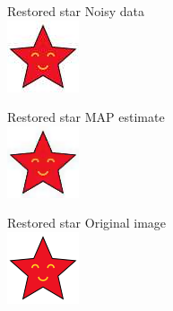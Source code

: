 \documentclass[10pt]{beamer}
\begin{document}
\begin{frame}{Restored star}
\centering
Noisy data
\\
\includegraphics[height=40ex]{results/star-tmp} 
\end{frame}
\begin{frame}{Restored star}
\centering
MAP estimate\vphantom{y}
\\
\includegraphics[height=40ex]{results/star-fixed} 
\end{frame}
\begin{frame}{Restored star}
\centering
Original image
\\
\includegraphics[height=40ex]{results/star} 
\end{frame}
\end{document}
